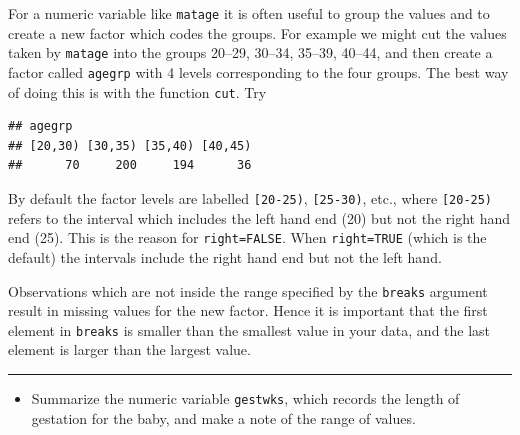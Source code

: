 \documentclass[
]{book}
\newenvironment{Shaded}{\begin{snugshade}}{\end{snugshade}}
\newcommand{\AttributeTok}[1]{\textcolor[rgb]{0.13,0.29,0.53}{#1}}
\newcommand{\ConstantTok}[1]{\textcolor[rgb]{0.56,0.35,0.01}{#1}}
\newcommand{\DecValTok}[1]{\textcolor[rgb]{0.00,0.00,0.81}{#1}}
\newcommand{\FunctionTok}[1]{\textcolor[rgb]{0.13,0.29,0.53}{\textbf{#1}}}
\newcommand{\NormalTok}[1]{#1}
\newcommand{\OtherTok}[1]{\textcolor[rgb]{0.56,0.35,0.01}{#1}}
\newcommand{\SpecialCharTok}[1]{\textcolor[rgb]{0.81,0.36,0.00}{\textbf{#1}}}
\providecommand{\tightlist}{%
  \setlength{\itemsep}{0pt}\setlength{\parskip}{0pt}}
\begin{document}
For a numeric variable like \texttt{matage} it is often useful
to group the values and to create a new factor which codes the groups.
For example we might cut the values taken by \texttt{matage} into the
groups 20--29, 30--34, 35--39, 40--44, and then create a factor called
\texttt{agegrp} with 4 levels corresponding to the four groups. The best way of doing this is
with the function \texttt{cut}. Try

\begin{Shaded}
\end{Shaded}

\begin{verbatim}
## agegrp
## [20,30) [30,35) [35,40) [40,45) 
##      70     200     194      36
\end{verbatim}

By default the factor levels are labelled \texttt{{[}20-25)},
\texttt{{[}25-30)}, etc., where \texttt{{[}20-25)} refers to the interval
which includes the left hand end (20) but not the right hand end
(25). This is the reason for \texttt{right=FALSE}. When \texttt{right=TRUE}
(which is the default) the intervals include the right hand end but
not the left hand.

Observations which are not inside the range specified by the \texttt{breaks}
argument result in missing values for the new factor. Hence it
is important that the first element in \texttt{breaks} is smaller than the
smallest value in your data, and the last element is larger than the
largest value.

\begin{center}\rule{0.5\linewidth}{0.5pt}\end{center}

\begin{itemize}
\tightlist
\item
  Summarize the numeric variable \texttt{gestwks}, which records the
  length of gestation for the baby, and make a note of the range of
  values.
\end{itemize}
\end{document}

